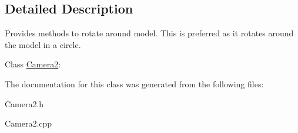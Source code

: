 \subsection{Detailed Description}
Provides methods to rotate around model. This is preferred as it rotates around the model in a circle. 

Class \hyperlink{class_camera2}{Camera2}\+: 

The documentation for this class was generated from the following files\+:\begin{DoxyCompactItemize}
\item 
Camera2.\+h\item 
Camera2.\+cpp\end{DoxyCompactItemize}
